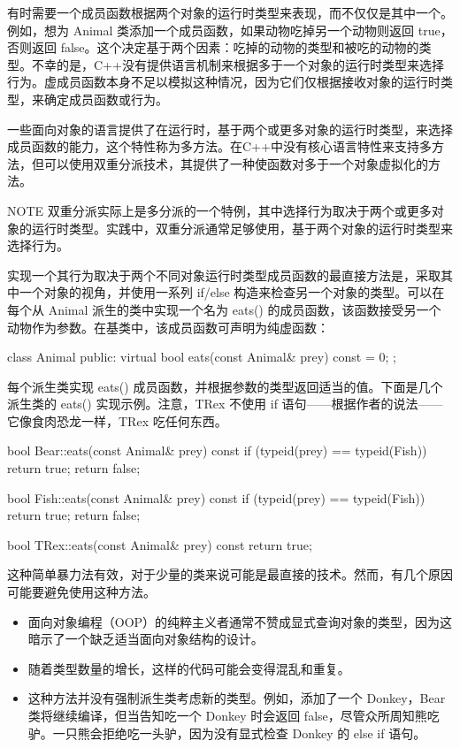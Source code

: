 有时需要一个成员函数根据两个对象的运行时类型来表现，而不仅仅是其中一个。例如，想为 Animal 类添加一个成员函数，如果动物吃掉另一个动物则返回 true，否则返回 false。这个决定基于两个因素：吃掉的动物的类型和被吃的动物的类型。不幸的是，C++没有提供语言机制来根据多于一个对象的运行时类型来选择行为。虚成员函数本身不足以模拟这种情况，因为它们仅根据接收对象的运行时类型，来确定成员函数或行为。

一些面向对象的语言提供了在运行时，基于两个或更多对象的运行时类型，来选择成员函数的能力，这个特性称为多方法。在C++中没有核心语言特性来支持多方法，但可以使用双重分派技术，其提供了一种使函数对多于一个对象虚拟化的方法。

\begin{myNotic}{NOTE}
双重分派实际上是多分派的一个特例，其中选择行为取决于两个或更多对象的运行时类型。实践中，双重分派通常足够使用，基于两个对象的运行时类型来选择行为。
\end{myNotic}


实现一个其行为取决于两个不同对象运行时类型成员函数的最直接方法是，采取其中一个对象的视角，并使用一系列 if/else 构造来检查另一个对象的类型。可以在每个从 Animal 派生的类中实现一个名为 eats() 的成员函数，该函数接受另一个动物作为参数。在基类中，该成员函数可声明为纯虚函数：

\begin{cpp}
class Animal
{
    public:
        virtual bool eats(const Animal& prey) const = 0;
};
\end{cpp}

每个派生类实现 eats() 成员函数，并根据参数的类型返回适当的值。下面是几个派生类的 eats() 实现示例。注意，TRex 不使用 if 语句——根据作者的说法——它像食肉恐龙一样，TRex 吃任何东西。

\begin{cpp}
bool Bear::eats(const Animal& prey) const
{
    if (typeid(prey) == typeid(Fish)) { return true; }
    return false;
}

bool Fish::eats(const Animal& prey) const
{
    if (typeid(prey) == typeid(Fish)) { return true; }
    return false;
}

bool TRex::eats(const Animal& prey) const
{
    return true;
}
\end{cpp}

这种简单暴力法有效，对于少量的类来说可能是最直接的技术。然而，有几个原因可能要避免使用这种方法。

\begin{itemize}
\item
面向对象编程（OOP）的纯粹主义者通常不赞成显式查询对象的类型，因为这暗示了一个缺乏适当面向对象结构的设计。

\item
随着类型数量的增长，这样的代码可能会变得混乱和重复。

\item
这种方法并没有强制派生类考虑新的类型。例如，添加了一个 Donkey，Bear 类将继续编译，但当告知吃一个 Donkey 时会返回 false，尽管众所周知熊吃驴。一只熊会拒绝吃一头驴，因为没有显式检查 Donkey 的 else if 语句。
\end{itemize}

